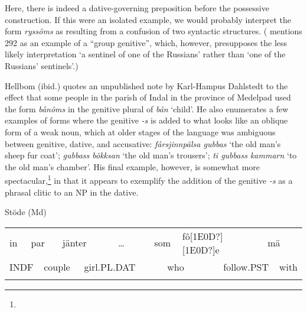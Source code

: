 \begin{styleBodyTextFirst}
Here, there is indeed a dative-governing preposition before the possessive construction. If this were an isolated example, we would probably interpret the form \textit{ryssôms} as resulting from a confusion of two syntactic structures. (\citet[38]{Delsing2003a} mentions 292 as an example of a “group genitive”, which, however, presupposes the less likely interpretation ‘a sentinel of one of the Russians’ rather than ‘one of the Russians’ sentinels’.) 

\end{styleBodyTextFirst}

\begin{styleBodytextC}
Hellbom (ibid.) quotes an unpublished note by Karl-Hampus Dahlstedt to the effect that some people in the parish of Indal in the province of Medelpad used the form \textit{bånôms} in the genitive plural of \textit{bån} ‘child’. He also enumerates a few examples of forms where the genitive\textit{ -s} is added to what looks like an oblique form of a weak noun, which at older stages of the language was ambiguous between genitive, dative, and accusative: \textit{fårsjinnpälsa gubbas} ‘the old man’s sheep fur coat’; \textit{gu{\textasciigrave}bbass bökksan} ‘the old man’s trousers’; \textit{ti gu{\textasciigrave}bbass kammarn} ‘to the old man’s chamber’. His final example, however, is somewhat more spectacular,\footnote{} in that it appears to exemplify the addition of the genitive\textit{ -s} as a phrasal clitic to an NP in the dative. 

\end{styleBodytextC}

\begin{listWWNumileveli}
\item {}

\begin{styleExample}
Stöde (Md)

\end{styleExample}

\end{listWWNumileveli}

\begin{tabular}{llllllllllllll}
\lsptoprule
in & \multicolumn{2}{l}{par

} & \multicolumn{2}{l}{jänter

} & \multicolumn{2}{l}{…

} & \multicolumn{2}{l}{som

} & \multicolumn{2}{l}{fô[1E0D?][1E0D?]e

} & \multicolumn{2}{l}{mä

} & \\
\multicolumn{2}{l}{INDF

} & \multicolumn{2}{l}{couple

} & \multicolumn{2}{l}{girl.PL.DAT

} & \multicolumn{2}{l}{} & \multicolumn{2}{l}{who

} & \multicolumn{2}{l}{follow.PST

} & \multicolumn{2}{l}{with

}\\
\lspbottomrule
\end{tabular}

